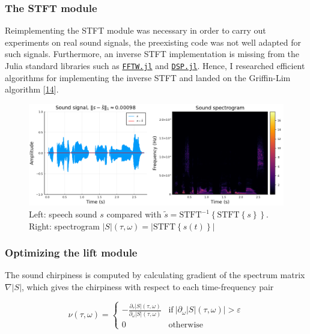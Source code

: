 \documentclass[
  american,
]{article}
\begin{document}
\hypertarget{the-stft-module}{%
\subsubsection{The STFT module}\label{the-stft-module}}

Reimplementing the STFT module was necessary in order to carry out
experiments on real sound signals, the preexisting code was not well
adapted for such signals.
Furthermore, an inverse STFT implementation is missing from the Julia
standard libraries such as \href{https://juliapackages.com/p/fftw}{\texttt{FFTW.jl}}
and \href{https://juliapackages.com/p/dsp}{\texttt{DSP.jl}}.
Hence, I researched efficient algorithms for implementing the inverse STFT
and landed on the Griffin-Lim algorithm {[}\protect\hyperlink{ref-griffin1983}{14}{]}.

\begin{figure}
\centering
\includegraphics{img/stft_istft.png}
\caption{Left: speech sound \(s\) compared with \(\tilde s=\mathrm{STFT}^{-1}\left\{\mathrm{STFT}\left\{s\right\}\right\}\). Right: spectrogram \(\left\lvert S\right\rvert(\tau,\omega)=\left\lvert\mathrm{STFT}\left\{s(t)\right\}\right\rvert\)}
\end{figure}

\hypertarget{optimizing-the-lift-module}{%
\subsubsection{Optimizing the lift module}\label{optimizing-the-lift-module}}

The sound chirpiness is computed by calculating gradient of the spectrum matrix \(\nabla\left\lvert S\right\rvert\),
which gives the chirpiness with respect to each time-frequency pair

\begin{equation}
\nu(\tau,\omega) =
\begin{cases}
-\frac{\partial_\tau\left\lvert S\right\rvert(\tau,\omega)}{\partial_\omega\left\lvert S\right\rvert(\tau,\omega)} & \text{if}~\left\lvert\partial_\omega\left\lvert S\right\rvert(\tau,\omega)\right\rvert>\varepsilon\\
0 & \text{otherwise}
\end{cases}
\end{equation}
\end{document}
